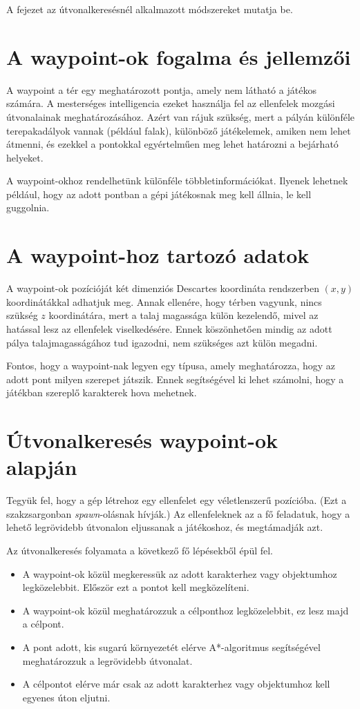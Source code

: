 \label{Chap:utvonalkereses}

A fejezet az útvonalkeresésnél alkalmazott módszereket mutatja be.

\section{A waypoint-ok fogalma és jellemzői}

A waypoint a tér egy meghatározott pontja, amely nem látható a játékos számára. A mesterséges intelligencia ezeket használja fel az ellenfelek mozgási útvonalainak meghatározásához. Azért van rájuk szükség, mert a pályán különféle terepakadályok vannak (például falak), különböző játékelemek, amiken nem lehet átmenni, és ezekkel a pontokkal egyértelműen meg lehet határozni a bejárható helyeket.

A waypoint-okhoz rendelhetünk különféle többletinformációkat. Ilyenek lehetnek például, hogy az adott pontban a gépi játékosnak meg kell állnia, le kell guggolnia.

\section{A waypoint-hoz tartozó adatok}

A waypoint-ok pozícióját két dimenziós Descartes koordináta rendszerben $(x, y)$ koordinátákkal adhatjuk meg. Annak ellenére, hogy térben vagyunk, nincs szükség $z$ koordinátára, mert a talaj magassága külön kezelendő, mivel az hatással lesz az ellenfelek viselkedésére. Ennek köszönhetően mindig az adott pálya talajmagasságához tud igazodni, nem szükséges azt külön megadni.

Fontos, hogy a waypoint-nak legyen egy típusa, amely meghatározza, hogy az adott pont milyen szerepet játszik. Ennek segítségével ki lehet számolni, hogy a játékban szereplő karakterek hova mehetnek.

\section{Útvonalkeresés waypoint-ok alapján}

Tegyük fel, hogy a gép létrehoz egy ellenfelet egy véletlenszerű pozícióba. (Ezt a szakzsargonban \textit{spawn}-olásnak hívják.) Az ellenfeleknek az a fő feladatuk, hogy a lehető legrövidebb útvonalon eljussanak a játékoshoz, és megtámadják azt. 

Az útvonalkeresés folyamata a következő fő lépésekből épül fel.
\begin{itemize}
\item A waypoint-ok közül megkeressük az adott karakterhez vagy objektumhoz legközelebbit. Először ezt a pontot kell megközelíteni.
\item A waypoint-ok közül meghatározzuk a célponthoz legközelebbit, ez lesz majd a célpont.
\item A pont adott, kis sugarú környezetét elérve A*-algoritmus segítségével meghatározzuk a legrövidebb útvonalat.
\item A célpontot elérve már csak az adott karakterhez vagy objektumhoz kell egyenes úton eljutni.
\end{itemize}

